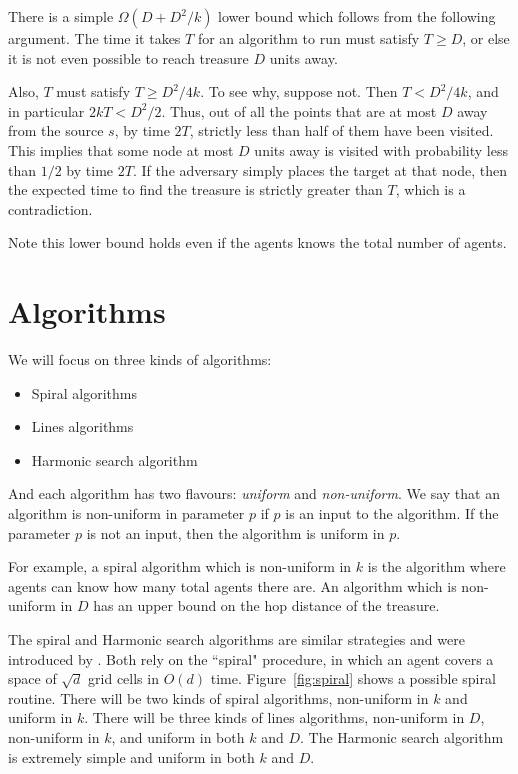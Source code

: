 \documentclass[runningheads,a4paper]{llncs}
\begin{document}
There is a simple $\Omega(D+D^2/k)$ lower bound which follows from the following argument. The time it takes $T$ for an algorithm to run must satisfy $T \geq D$, or else it is not even possible to reach treasure $D$ units away. 

Also, $T$ must satisfy $T \geq D^2/4k$. To see why, suppose not. Then $T < D^2/4k$, and in particular $2kT < D^2/2$. Thus, out of all the points that are at most $D$ away from the source $s$, by time $2T$, strictly less than half of them have been visited. This implies that some node at most $D$ units away is visited with probability less than $1/2$ by time $2T$. If the adversary simply places the target at that node, then the expected time to find the treasure is strictly greater than $T$, which is a contradiction.

Note this lower bound holds even if the agents knows the total number of agents. 

\section{Algorithms}

We will focus on three kinds of algorithms:
\begin{itemize}
\item Spiral algorithms
\item Lines algorithms
\item Harmonic search algorithm
\end{itemize}

And each algorithm has two flavours: \emph{uniform} and \emph{non-uniform}. We say that an algorithm is non-uniform in parameter $p$ if $p$ is an input to the algorithm. If the parameter $p$ is not an input, then the algorithm is uniform in $p$. 

For example, a spiral algorithm which is non-uniform in $k$ is the algorithm where agents can know how many total agents there are. An algorithm which is non-uniform in $D$ has an upper bound on the hop distance of the treasure. 

The spiral and Harmonic search algorithms are similar strategies and were introduced by \cite{feinerman2012collaborative}. Both rely on the ``spiral" procedure, in which an agent covers a space of $\sqrt{d}$ grid cells in $O(d)$ time. Figure~\ref{fig:spiral} shows a possible spiral routine.
There will be two kinds of spiral algorithms, non-uniform in $k$ and uniform in $k$. There will be three kinds of lines algorithms, non-uniform in $D$, non-uniform in $k$, and uniform in both $k$ and $D$. The Harmonic search algorithm is extremely simple and uniform in both $k$ and $D$. 
\end{document}
